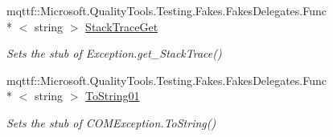 \begin{DoxyCompactItemize}
mqttf\-::\-Microsoft.\-Quality\-Tools.\-Testing.\-Fakes.\-Fakes\-Delegates.\-Func\\*
$<$ string $>$ \hyperlink{class_system_1_1_runtime_1_1_interop_services_1_1_fakes_1_1_stub_c_o_m_exception_a83b89d04ccbebf5a53299642ae35afd7}{Stack\-Trace\-Get}
\begin{DoxyCompactList}\small\item\em Sets the stub of Exception.\-get\-\_\-\-Stack\-Trace()\end{DoxyCompactList}\item 
mqttf\-::\-Microsoft.\-Quality\-Tools.\-Testing.\-Fakes.\-Fakes\-Delegates.\-Func\\*
$<$ string $>$ \hyperlink{class_system_1_1_runtime_1_1_interop_services_1_1_fakes_1_1_stub_c_o_m_exception_a306c59cb72ced9047e1381172bae1280}{To\-String01}
\begin{DoxyCompactList}\small\item\em Sets the stub of C\-O\-M\-Exception.\-To\-String()\end{DoxyCompactList}\end{DoxyCompactItemize}

